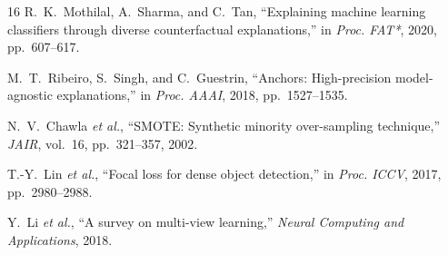 \documentclass[10pt,a4paper,twocolumn]{article}
\begin{document}
{\begin{thebibliography}{16}
R.~K.~Mothilal, A.~Sharma, and C.~Tan, ``Explaining machine learning classifiers through diverse counterfactual explanations,'' in \textit{Proc. FAT*}, 2020, pp.~607--617.

M.~T.~Ribeiro, S.~Singh, and C.~Guestrin, ``Anchors: High-precision model-agnostic explanations,'' in \textit{Proc. AAAI}, 2018, pp.~1527--1535.

N.~V.~Chawla \textit{et al.}, ``SMOTE: Synthetic minority over-sampling technique,'' \textit{JAIR}, vol.~16, pp.~321--357, 2002.

T.-Y.~Lin \textit{et al.}, ``Focal loss for dense object detection,'' in \textit{Proc. ICCV}, 2017, pp.~2980--2988.

Y.~Li \textit{et al.}, ``A survey on multi-view learning,'' \textit{Neural Computing and Applications}, 2018.

\end{thebibliography}
}
\end{document}

